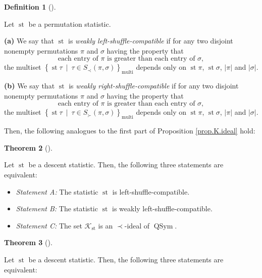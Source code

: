 \documentclass[numbers=enddot,12pt,final,onecolumn,notitlepage]{scrartcl}%
\theoremstyle{definition}
\newtheorem{theo}{Theorem}[section]
\newenvironment{theorem}[1][]
{\begin{theo}[#1]\begin{leftbar}}
{\end{leftbar}\end{theo}}
\newtheorem{defi}[theo]{Definition}
\newenvironment{definition}[1][]
{\begin{defi}[#1]\begin{leftbar}}
{\end{leftbar}\end{defi}}
\newenvironment{vershort}{}{}
\begin{document}
\begin{vershort}
\begin{definition}
Let $\operatorname{st}$ be a permutation statistic.

\textbf{(a)} We say that $\operatorname{st}$ is \textit{weakly
left-shuffle-compatible} if for any two disjoint nonempty permutations $\pi$
and $\sigma$ having the property that%
\[
\text{each entry of }\pi\text{ is greater than each entry of }\sigma,
\]
the multiset $\left\{  \operatorname{st} \tau   \ \mid\ \tau\in
S_{\prec}\left(  \pi,\sigma\right)  \right\}  _{\operatorname*{multi}}$
depends only on $\operatorname{st} \pi$, $\operatorname{st} \sigma$,
$\left\vert \pi\right\vert $ and $\left\vert \sigma\right\vert $.

\textbf{(b)} We say that $\operatorname{st}$ is \textit{weakly
right-shuffle-compatible} if for any two disjoint nonempty permutations $\pi$
and $\sigma$ having the property that%
\[
\text{each entry of }\pi\text{ is greater than each entry of }\sigma,
\]
the multiset $\left\{  \operatorname{st} \tau   \ \mid\ \tau\in
S_{\succ}\left(  \pi,\sigma\right)  \right\}  _{\operatorname*{multi}}$
depends only on $\operatorname{st} \pi$, $\operatorname{st} \sigma$,
$\left\vert \pi\right\vert $ and $\left\vert \sigma\right\vert $.
\end{definition}

Then, the following analogues to the first part of Proposition
\ref{prop.K.ideal} hold:

\begin{theorem}
\label{thm.dendri.K.ideal}Let $\operatorname{st}$ be a descent statistic.
Then, the following three statements are equivalent:

\begin{itemize}
\item \textit{Statement A:} The statistic $\operatorname{st}$ is left-shuffle-compatible.

\item \textit{Statement B:} The statistic $\operatorname{st}$ is weakly left-shuffle-compatible.

\item \textit{Statement C:} The set $\mathcal{K}_{\operatorname{st}}$ is an
$\left.  \prec\right.  $-ideal of $\operatorname*{QSym}$.
\end{itemize}
\end{theorem}

\begin{theorem}
\label{thm.dendri.K.ideal-R}Let $\operatorname{st}$ be a descent statistic.
Then, the following three statements are equivalent:


\end{theorem}
\end{vershort}
\end{document}
